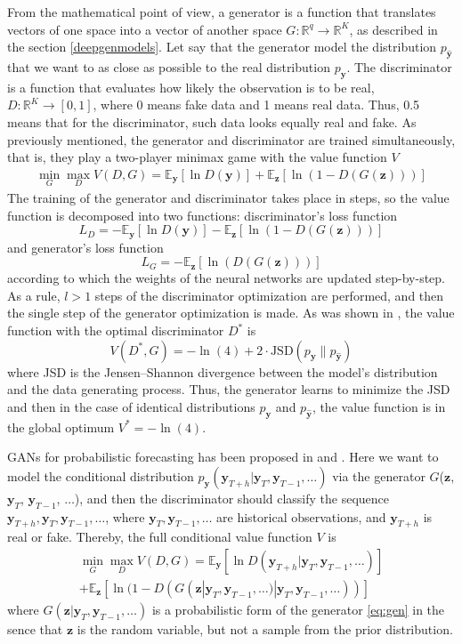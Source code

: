 \documentclass[12pt,a4paper]{article}
\begin{document}
From the mathematical point of view, a generator is a function that translates vectors of one space into a vector of another space $G: \mathbb R^q \to \mathbb R^K$, as described in the section \ref{deepgenmodels}. Let say that the generator model the distribution $p_\mathbf{\hat y}$ that we want to as close as possible to the real distribution $p_\mathbf y$. The discriminator is a function that evaluates how likely the observation is to be real, $D: \mathbb R^K \to [0, 1]$, where 0 means fake data and 1 means real data. Thus, 0.5 means that for the discriminator, such data looks equally real and fake. As previously mentioned, the generator and discriminator are trained simultaneously, that is, they play a two-player minimax game with the value function $V$
$$\begin{aligned}
\min _{G} \max _{D} V(D, G) =\mathbb{E}_\mathbf{y}[\ln D(\mathbf{y})]+ \mathbb{E}_\mathbf{z}[\ln (1-D(G(\mathbf{z})))]
\end{aligned}$$
The training of the generator and discriminator takes place in steps, so the value function is decomposed into two functions: discriminator's loss function 
$$L_D = -\mathbb{E}_\mathbf{y}[\ln D(\mathbf{y})] - \mathbb{E}_{\mathbf{z}}[\ln (1-D(G(\mathbf{z})))]$$
and generator's loss function
$$L_G = -\mathbb{E}_{\mathbf{z}}[\ln (D(G(\mathbf{z})))]$$
according to which the weights of the neural networks are updated step-by-step. As a rule, $l>1$ steps of the discriminator optimization are performed, and then the single step of the generator optimization is made.  As was shown in \cite{goodfellow2014}, the value function with the optimal discriminator $D^*$ is 
$$V(D^*, G)=-\ln (4)+2 \cdot \text{JSD}(p_\mathbf{y} \| p_\mathbf{\hat y} )$$
where JSD is the Jensen–Shannon divergence between the model’s distribution and the data generating process. Thus, the generator learns to minimize the JSD and then in the case of identical distributions $p_\mathbf{y}$ and $p_\mathbf{\hat y}$, the value function is in the global optimum $V^* = - \ln (4)$.

GANs for probabilistic forecasting has been proposed in \cite{koshiyama2019generative} and \cite{koochali2020like}. Here we want to model the conditional distribution $p_\mathbf y(\mathbf y_{T+h}|\mathbf{y}_{T}, \mathbf{y}_{T-1}, \dots)$ via the generator $G$($\mathbf z$, $\mathbf{y}_{T}$, $\mathbf{y}_{T-1}$, $\dots$), and then the discriminator should classify the sequence $\mathbf y_{T+h}, \mathbf{y}_{T}, \mathbf{y}_{T-1}, \dots$, where $\mathbf{y}_{T}, \mathbf{y}_{T-1}, \dots$ are historical observations, and $\mathbf y_{T+h}$ is real or fake. Thereby, the full conditional value function $V$ is 
$$
\begin{aligned}
\min _{G} \max _{D} V(D, G) =\mathbb{E}_\mathbf{y}[\ln D(\mathbf y_{T+h} | \mathbf{y}_{T}, \mathbf{y}_{T-1}, \dots)]\\
+ \mathbb{E}_\mathbf{z}[\ln (1-D(G(\mathbf z | \mathbf{y}_{T}, \mathbf{y}_{T-1}, \dots) | \mathbf{y}_{T}, \mathbf{y}_{T-1}, \dots))]    
\end{aligned}
$$
where $G(\mathbf z | \mathbf{y}_{T}, \mathbf{y}_{T-1}, \dots)$ is a probabilistic form of the generator \eqref{eq:gen} in the sence that $\mathbf z$ is the random variable, but not a sample from the prior distribution.
\end{document}
